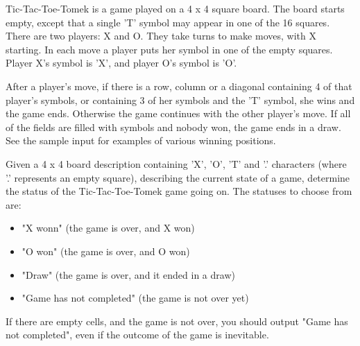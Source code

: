 Tic-Tac-Toe-Tomek is a game played on a 4 x 4 square board.
The board starts empty, except that a single 'T' symbol may appear in one of the 16 squares.
There are two players: X and O. They take turns to make moves, with X starting.
In each move a player puts her symbol in one of the empty squares.
Player X's symbol is 'X', and player O's symbol is 'O'.

After a player's move, if there is a row, column or a diagonal containing 4 of that player's
symbols, or containing 3 of her symbols and the 'T' symbol, she wins and the game ends.
Otherwise the game continues with the other player's move. If all of the fields are filled with
symbols and nobody won, the game ends in a draw. See the sample input for examples of various
winning positions.

Given a 4 x 4 board description containing 'X', 'O', 'T' and '.' characters (where '.'
represents an empty square), describing the current state of a game, determine the status of
the Tic-Tac-Toe-Tomek game going on. The statuses to choose from are:

\begin{itemize}
  \item "X wonn" (the game is over, and X won)
  \item "O won" (the game is over, and O won)
  \item "Draw" (the game is over, and it ended in a draw)
  \item "Game has not completed" (the game is not over yet)
\end{itemize}

If there are empty cells, and the game is not over, you should output "Game has not completed",
even if the outcome of the game is inevitable.
